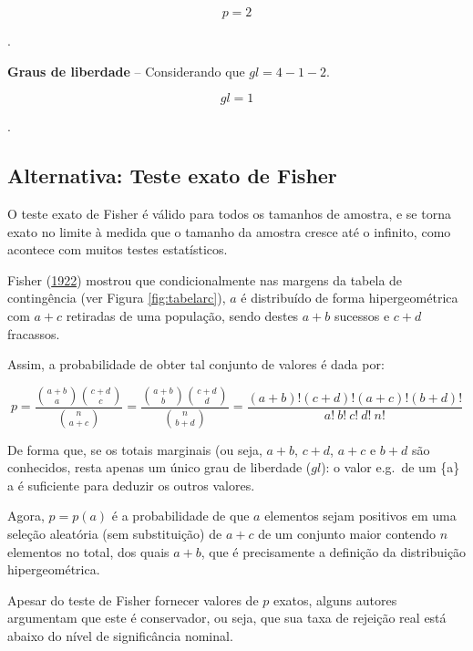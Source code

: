 \documentclass[
]{book}
\begin{document}
\[p=2\]

.\linebreak

\textbf{Graus de liberdade} -- Considerando que \(gl=4-1-2\).

\[gl=1\]

.\linebreak

\hypertarget{alternativa-teste-exato-de-fisher}{%
\subsection{Alternativa: Teste exato de Fisher}\label{alternativa-teste-exato-de-fisher}}

O teste exato de Fisher é válido para todos os tamanhos de amostra, e se torna exato no limite à medida que o tamanho da amostra cresce até o infinito, como acontece com muitos testes estatísticos.

Fisher (\href{https://doi.org/10.2307/2340521}{1922}) mostrou que condicionalmente nas margens da tabela de contingência (ver Figura \ref{fig:tabelarc}), \(a\) é distribuído de forma hipergeométrica com \(a+c\) retiradas de uma população, sendo destes \(a+b\) sucessos e \(c+d\) fracassos.

Assim, a probabilidade de obter tal conjunto de valores é dada por:

\begin{equation}
   p = \frac{\binom{a+b}{a}\binom{c+d}{c}}{\binom{n}{a+c}}=\frac{\binom{a+b}{b}\binom{c+d}{d}}{\binom{n}{b+d}}=\frac{ \left( a+b \right)! \left( c+d \right)! \left( a+c  \right)! \left( b+d  \right)! }{a! \ b! \  c! \ d! \ n!}
  \label{eq:testefisher}
\end{equation}

De forma que, se os totais marginais (ou seja, \(a + b\), \(c + d\), \(a + c\) e \(b + d\) são conhecidos, resta apenas um único grau de liberdade (\(gl\)): o valor e.g.~de um \{\displaystyle a\} a é suficiente para deduzir os outros valores.

Agora, \(p = p ( a )\) é a probabilidade de que \(a\) elementos sejam positivos em uma seleção aleatória (sem substituição) de \(a + c\) de um conjunto maior contendo \(n\) elementos no total, dos quais \(a + b\), que é precisamente a definição da distribuição hipergeométrica.

Apesar do teste de Fisher fornecer valores de \(p\) exatos, alguns autores argumentam que este é conservador, ou seja, que sua taxa de rejeição real está abaixo do nível de significância nominal.
\end{document}
